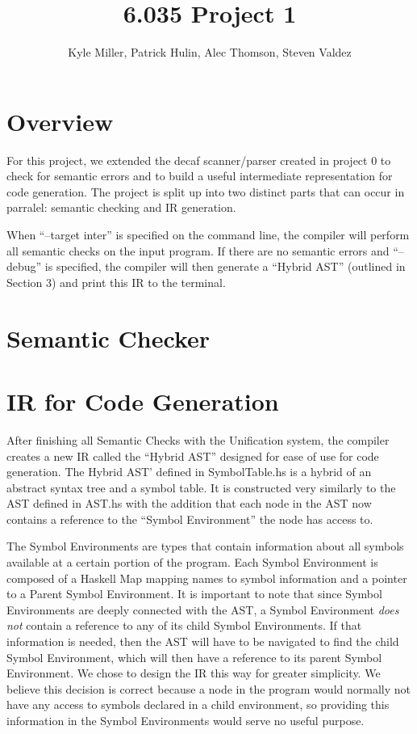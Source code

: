 \documentclass[11pt]{article}
\title{6.035 Project 1}
\author{Kyle Miller, Patrick Hulin, Alec Thomson, Steven Valdez}
\begin{document}
\maketitle

\section{Overview} 

For this project, we extended the decaf scanner/parser created in project 0 to check for semantic errors and to build a useful intermediate representation for code generation. The project is split up into two distinct parts that can occur in parralel: semantic checking and IR generation. 

When ``--target inter'' is specified on the command line, the compiler will perform all semantic checks on the input program. If there are no semantic errors and ``--debug'' is specified, the compiler will then generate a ``Hybrid AST'' (outlined in Section 3) and print this IR to the terminal. 

\section{Semantic Checker}

\section{IR for Code Generation}

After finishing all Semantic Checks with the Unification system, the compiler creates a new IR called the ``Hybrid AST'' designed for ease of use for code generation. The Hybrid AST' defined in SymbolTable.hs is a hybrid of an abstract syntax tree and a symbol table. It is constructed very similarly to the AST defined in AST.hs with the addition that each node in the AST now contains a reference to the ``Symbol Environment''  the node has access to. 

The Symbol Environments are types that contain information about all symbols available at a certain portion of the program. Each Symbol Environment is composed of a Haskell Map mapping names to symbol information and a pointer to a Parent Symbol Environment. It is important to note that since Symbol Environments are deeply connected with the AST, a Symbol Environment \emph{does not} contain a reference to any of its child Symbol Environments. If that information is needed, then the AST will have to be navigated to find the child Symbol Environment, which will then have a reference to its parent Symbol Environment. We chose to design the IR this way for greater simplicity. We believe this decision is correct because a node in the program would normally not have any access to symbols declared in a child environment, so providing this information in the Symbol Environments would serve no useful purpose. 
\end{document}
